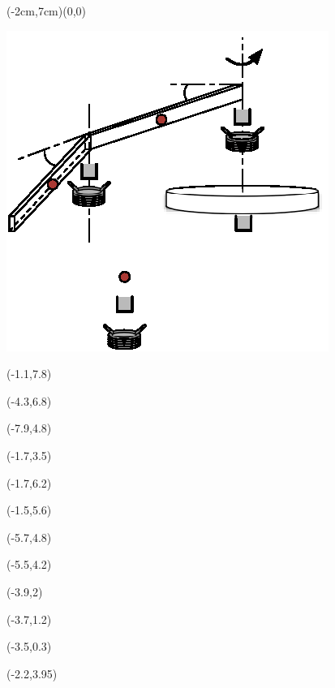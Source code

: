 \documentclass{article}
\begin{document}
\small

\begin{psdraw}(-2cm,7cm)(0,0)

\includegraphics[width=0.7\linewidth]{rotary_flexible_beam_3DOF_breakdown.eps}


\move(-1.1,7.8)

\move(-4.3,6.8)

\move(-7.9,4.8)

\move(-1.7,3.5)

\move(-1.7,6.2)

\move(-1.5,5.6)

\move(-5.7,4.8)

\move(-5.5,4.2)

\move(-3.9,2)

\move(-3.7,1.2)

\move(-3.5,0.3)

\move(-2.2,3.95)

\end{psdraw}
\end{document}

